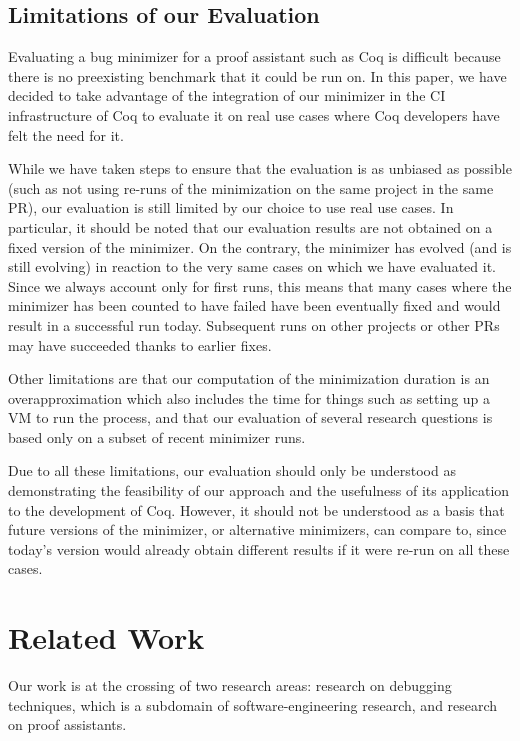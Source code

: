 \documentclass[a4paper,USenglish,cleveref,autoref,thm-restate]{lipics-v2021}
\begin{document}
\subsection{Limitations of our Evaluation}

Evaluating a bug minimizer for a proof assistant such as Coq is difficult because there is no preexisting benchmark that it could be run on. In this paper, we have decided to take advantage of the integration of our minimizer in the CI infrastructure of Coq to evaluate it on real use cases where Coq developers have felt the need for it.

While we have taken steps to ensure that the evaluation is as unbiased as possible (such as not using re-runs of the  minimization on the same project in the same PR), our evaluation is still limited by our choice to use real use cases. In particular, it should be noted that our evaluation results are not obtained on a fixed version of the minimizer. On the contrary, the minimizer has evolved (and is still evolving) in reaction to the very same cases on which we have evaluated it.
Since we always account only for first runs, this means that many cases where the minimizer has been counted to have failed have been eventually fixed and would result in a successful run today. Subsequent runs on other projects or other PRs may have succeeded thanks to earlier fixes.

Other limitations are that our computation of the minimization duration is an overapproximation which also includes the time for things such as setting up a VM to run the process, and that our evaluation of several research questions is based only on a subset of recent minimizer runs.

Due to all these limitations, our evaluation should only be understood as demonstrating the feasibility of our approach and the usefulness of its application to the development of Coq. However, it should not be understood as a basis that future versions of the minimizer, or alternative minimizers, can compare to, since today's version would already obtain different results if it were re-run on all these cases.

\section{Related Work}\label{sec:related-work}

Our work is at the crossing of two research areas: research on debugging techniques, which is a subdomain of software-engineering research, and research on proof assistants.
\end{document}
